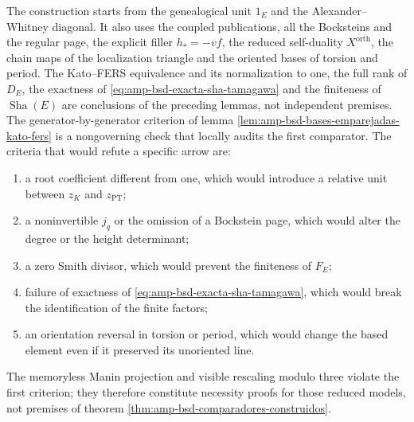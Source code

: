 The construction starts from the genealogical unit \(1_E\) and the Alexander--Whitney
diagonal. It also uses the
coupled publications, all the
Bocksteins and the regular page, the explicit filler \(h_*=-vf\), the
reduced self-duality \(X^{\mathrm{orth}}\), the chain maps of the
localization triangle and the oriented bases of torsion and period. The
Kato--FERS equivalence and its normalization to one, the full rank of \(D_E\), the
exactness of \eqref{eq:amp-bsd-exacta-sha-tamagawa} and the finiteness of
\(\operatorname{Sha}(E)\) are conclusions of the preceding lemmas, not
independent premises. The generator-by-generator criterion of lemma
\ref{lem:amp-bsd-bases-emparejadas-kato-fers} is a nongoverning check
that locally audits the first comparator. The criteria that would refute a specific arrow
are:
\begin{enumerate}
 \item a root coefficient different from one, which would introduce a relative
       unit between \(z_K\) and \(z_{\mathrm{PT}}\);
 \item a noninvertible \(j_q\) or the omission of a Bockstein page, which
       would alter the degree or the height determinant;
 \item a zero Smith divisor, which would prevent the finiteness of \(F_E\);
 \item failure of exactness of
       \eqref{eq:amp-bsd-exacta-sha-tamagawa}, which would break the identification
       of the finite factors;
 \item an orientation reversal in torsion or period, which would change the
       based element even if it preserved its unoriented line.
\end{enumerate}
The memoryless Manin projection and visible rescaling modulo three
violate the first criterion; they therefore constitute necessity proofs for
those reduced models, not premises of theorem
\ref{thm:amp-bsd-comparadores-construidos}.

